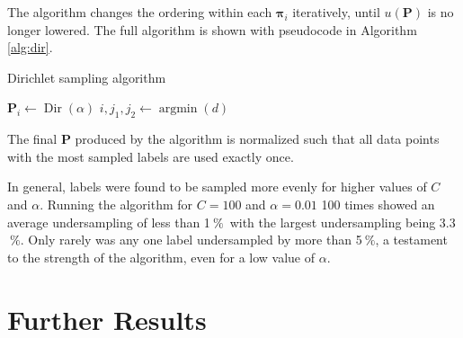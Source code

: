\documentclass{article}
\newcommand{\unit}[1]{\ensuremath{\:\text{#1}}}
\newcommand{\pro}{\ensuremath{\unit{\%{}}}}
\begin{document}
The algorithm changes the ordering within each $\bm\pi_i$ iteratively, until $u(\mathbf P)$ is no longer lowered.
The full algorithm is shown with pseudocode in Algorithm \ref{alg:dir}.
\begin{algorithm}
\caption{Dirichlet sampling algorithm}
\label{alg:dir}
\begin{algorithmic}
    \State $\mathbf P_i \gets \operatorname{Dir}(\alpha)$
\EndFor
\Loop
        \EndFor
    \EndFor
        \State $ i, j_1, j_2 \gets \operatorname{argmin}(d) $
    \Else
    \EndIf
\EndLoop
{}
\end{algorithmic}
\end{algorithm}
The final $\mathbf P$ produced by the algorithm is normalized such that all data points with the most sampled labels are used exactly once.

In general, labels were found to be sampled more evenly for higher values of $C$ and $\alpha$.
Running the algorithm for $C=100$ and $\alpha=0.01$ 100 times showed an average undersampling of less than 1\pro\ with the largest undersampling being 3.3\pro.
Only rarely was any one label undersampled by more than 5\pro, a testament to the strength of the algorithm, even for a low value of $\alpha$.

\section{Further Results}%
\end{document}
